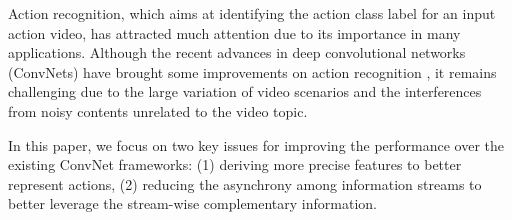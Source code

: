 \documentclass[letterpaper]{article} %
\begin{document}
Action recognition, which aims at identifying the action class label for an input action video, has attracted much attention due to its importance in many applications. Although the recent advances in deep convolutional networks (ConvNets) have brought some improvements on action recognition \cite{c3d,KVMF}, it remains challenging due to the large variation of video scenarios and the interferences from noisy contents unrelated to the video topic.

In this paper, we focus on two key issues for improving the performance over the existing ConvNet frameworks: (1) deriving more precise features to better represent actions, (2) reducing the asynchrony among information streams to better leverage the stream-wise complementary information.






\end{document}
